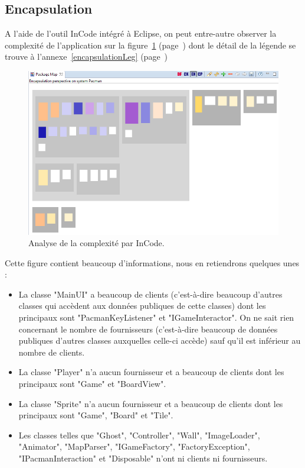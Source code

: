 \documentclass[12pt,a4paper,final]{article}
\newcommand{\annexe}[1]{annexe~\ref{#1} (page~\pageref{#1})}
\newcommand{\labelfigure}[1]{figure~\ref{#1} (page~\pageref{#1})}
\begin{document}
\subsection{Encapsulation}
A l'aide de l'outil InCode intégré à Eclipse, on peut entre-autre observer la complexité de l'application sur la \labelfigure{encapsulation} dont le détail de la légende se trouve à l'\annexe{encapsulationLeg}
\begin{figure}[!h]
	\centering
	\includegraphics[width=\textwidth]{InCodeEncapsulation.png}
	\caption{\label{encapsulation}Analyse de la complexité par InCode.}
\end{figure}
Cette figure contient beaucoup d'informations, nous en retiendrons quelques unes : 
\begin{itemize}
\item La classe "MainUI" a beaucoup de clients (c'est-à-dire beaucoup d'autres classes qui accèdent aux données publiques de cette classes) dont les principaux sont "PacmanKeyListener" et "IGameInteractor". On ne sait rien concernant le nombre de fournisseurs (c'est-à-dire beaucoup de données publiques d'autres classes auxquelles celle-ci accède) sauf qu'il est inférieur au nombre de clients.
\item La classe "Player" n'a aucun fournisseur et a beaucoup de clients dont les principaux sont "Game" et "BoardView".
\item La classe "Sprite" n'a aucun fournisseur et a beaucoup de clients dont les principaux sont "Game", "Board" et "Tile".
\item Les classes telles que "Ghost", "Controller", "Wall", "ImageLoader", "Animator", "MapParser", "IGameFactory", "FactoryException", "IPacmanInteraction" et "Disposable" n'ont ni clients ni fournisseurs.
\end{itemize}
\end{document}
